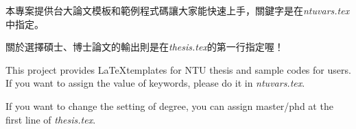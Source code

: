 \begin{abstractzh}
本專案提供台大論文模板和範例程式碼讓大家能快速上手，關鍵字是在\emph{ntuvars.tex}中指定。

關於選擇碩士、博士論文的輸出則是在\emph{thesis.tex}的第一行指定喔！
%
\end{abstractzh}

\begin{abstracten}
This project provides \LaTeX templates for NTU thesis and sample codes for users.
If you want to assign the value of keywords, please do it in \emph{ntuvars.tex}.

If you want to change the setting of degree, you can assign master/phd at the first line of \emph{thesis.tex}.
%
\end{abstracten}

